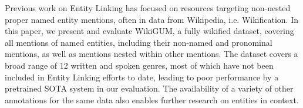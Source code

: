 Previous work on Entity Linking has focused on resources targeting non-nested proper named entity mentions, often in data from Wikipedia, i.e. Wikification. In this paper, we present and evaluate WikiGUM, a fully wikified dataset, covering all mentions of named entities, including their non-named and pronominal mentions, as well as mentions nested within other mentions. The dataset covers a broad range of 12 written and spoken genres, most of which have not been included in Entity Linking efforts to date, leading to poor performance by a pretrained SOTA system in our evaluation. The availability of a variety of other annotations for the same data also enables further research on entities in context.
